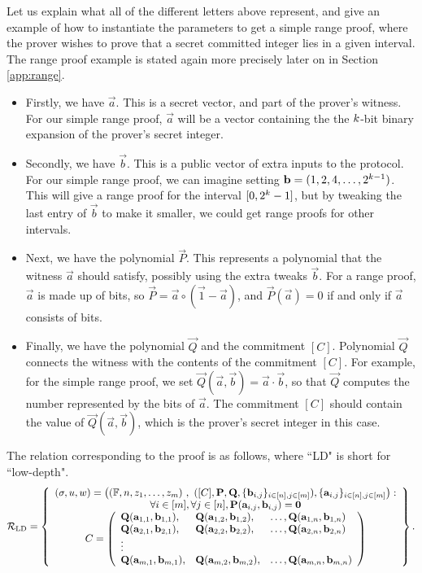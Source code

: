 Let us explain what all of the different letters above represent, and give an example of how to instantiate the parameters to get a simple range proof, where the prover wishes to prove that a secret committed integer lies in a given interval. The range proof example is stated again more precisely later on in Section \ref{app:range}.

\begin{itemize}
\item Firstly, we have $\vec{a}$. This is a secret vector, and part of the prover's witness. For our simple range proof, $\vec{a}$ will be a vector containing the the $k$-bit binary expansion of the prover's secret integer.
\item Secondly, we have $\vec{b}$. This is a public vector of extra inputs to the protocol. For our simple range proof, we can imagine setting $\mathbf{b} = (1,2,4,\ldots,2^{k-1})$. This will give a range proof for the interval $[0,2^k-1]$, but by tweaking the last entry of $\vec{b}$ to make it smaller, we could get range proofs for other intervals.
\item Next, we have the polynomial $\vec{P}$. This represents a polynomial that the witness $\vec{a}$ should satisfy, possibly using the extra tweaks $\vec{b}$. For a range proof, $\vec{a}$ is made up of bits, so $\vec{P} = \vec{a}\circ(\vec{1}-\vec{a})$, and $\vec{P}(\vec{a}) = 0$ if and only if $\vec{a}$ consists of bits.
\item Finally, we have the polynomial $\vec{Q}$ and the commitment $[C]$. Polynomial $\vec{Q}$ connects the witness with the contents of the commitment $[C]$. For example, for the simple range proof, we set $\vec{Q}(\vec{a},\vec{b}) = \vec{a}\cdot \vec{b}$, so that $\vec{Q}$ computes the number represented by the bits of $\vec{a}$. The commitment $[C]$ should contain the value of $\vec{Q}(\vec{a},\vec{b})$, which is the prover's secret integer in this case.
\end{itemize}

The relation corresponding to the proof is as follows, where ``LD" is short for ``low-depth". $$\mathcal{R}_\mathrm{LD}= \left\{\begin{array}{c}
(\mathsf{\sigma},u,w)=\left( (\mathbb{F},n,z_1,\ldots,z_m)\ , \  ([C],\mathbf{P},\mathbf{Q},\lbrace \mathbf{b}_{i,j} \rbrace_{i \in [n], j \in [m]}), \lbrace \mathbf{a}_{i,j} \rbrace_{i \in [n], j \in [m]} \right):\\
\forall i \in [m], \forall j \in [n], \mathbf{P}(\mathbf{a}_{i,j},\mathbf{b}_{i,j})=\mathbf{0} \\
C = \left(\begin{array}{lll}
\mathbf{Q}(\mathbf{a}_{1,1},\mathbf{b}_{1,1}),&\mathbf{Q}(\mathbf{a}_{1,2},\mathbf{b}_{1,2}),& \ldots,\mathbf{Q}(\mathbf{a}_{1,n},\mathbf{b}_{1,n}) \\
\mathbf{Q}(\mathbf{a}_{2,1},\mathbf{b}_{2,1}),&\mathbf{Q}(\mathbf{a}_{2,2},\mathbf{b}_{2,2}),& \ldots,\mathbf{Q}(\mathbf{a}_{2,n},\mathbf{b}_{2,n}) \\
\vdots \\
\mathbf{Q}(\mathbf{a}_{m,1},\mathbf{b}_{m,1}),&\mathbf{Q}(\mathbf{a}_{m,2},\mathbf{b}_{m,2}),& \ldots,\mathbf{Q}(\mathbf{a}_{m,n},\mathbf{b}_{m,n}) \\
\end{array}\right)
\end{array}\right\}.$$

